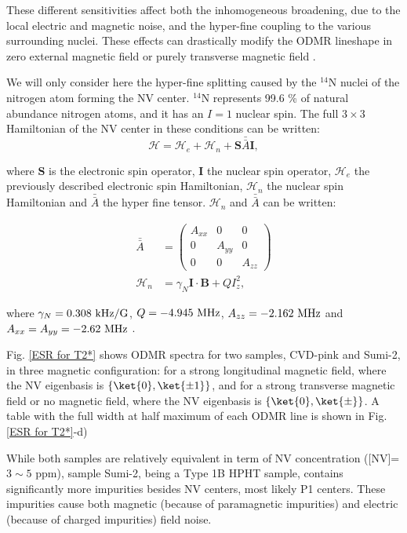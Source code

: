 \documentclass[a4paper,11pt]{report}
\begin{document}
These different sensitivities affect both the inhomogeneous broadening, due to the local electric and magnetic noise, and the hyper-fine coupling to the various surrounding nuclei. These effects can drastically modify the ODMR lineshape in zero external magnetic field \citep{jamonneau2016competition} or purely transverse magnetic field \citep{qiu2021nuclear,qiu2022nanoscale}.

We will only consider here the hyper-fine splitting caused by the $^14$N nuclei of the nitrogen atom forming the NV center. $^14$N represents 99.6 \% of natural abundance nitrogen atoms, and it has an $I=1$ nuclear spin. The full $3\times 3$ Hamiltonian of the NV center in these conditions can be written:
\begin{equation}
\mathcal{H}=\mathcal{H}_e + \mathcal{H}_n + \mathbf{S} \bar{\bar{A}} \mathbf{I},
\end{equation}

where $\mathbf{S}$ is the electronic spin operator, $\mathbf{I}$ the nuclear spin operator, $\mathcal{H}_e$ the previously described electronic spin Hamiltonian, $\mathcal{H}_n$ the nuclear spin Hamiltonian and $\bar{\bar{A}}$ the hyper fine tensor. $\mathcal{H}_n$ and $\bar{\bar{A}}$ can be written:

\begin{align}
\bar{\bar{A}} &= \begin{pmatrix}
A_{xx} & 0 & 0 \\
0 & A_{yy} & 0 \\
0 & 0 & A_{zz}
\end{pmatrix} \\
\mathcal{H}_n &= \gamma_N \mathbf{I} \cdot \mathbf{B} + Q I_z^2,
\end{align}

where $\gamma_N=0.308\ \rm kHz/G$, $Q=-4.945\ \rm MHz$, $A_{zz}=-2.162\ \rm MHz$ and $A_{xx}=A_{yy}=-2.62\ \rm MHz$ \citep{smeltzer2009robust}.

Fig. \ref{ESR for T2*} shows ODMR spectra for two samples, CVD-pink and Sumi-2, in three magnetic configuration: for a strong longitudinal magnetic field, where the NV eigenbasis is $\{ \ket{0}, \ket{\pm 1} \}$, and for a strong transverse magnetic field or no magnetic field, where the NV eigenbasis is $\{ \ket{0}, \ket{\pm} \}$. A table with the full width at half maximum of each ODMR line is shown in Fig. \ref{ESR for T2*}-d)

While both samples are relatively equivalent in term of NV concentration ([NV]=$3 \sim 5$ ppm), sample Sumi-2, being a Type 1B HPHT sample, contains significantly more impurities besides NV centers, most likely P1 centers. These impurities cause both magnetic (because of paramagnetic impurities) and electric (because of charged impurities) field noise.
\end{document}

